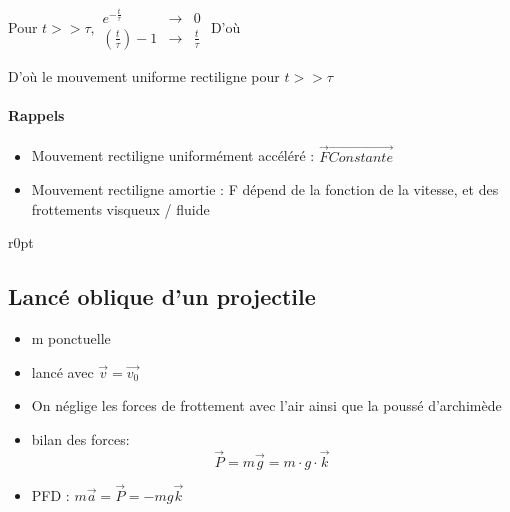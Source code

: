 Pour $t >> \tau, \begin{array}{rcl}
e^{-\frac{t}{\tau}} &\rightarrow& 0 \\
(\frac{t}{\tau})-1 &\rightarrow& \frac{t}{\tau}
\end{array}$ D'où ~\\
\begin{center}\end{center}
D'où le mouvement uniforme rectiligne pour $t >> \tau$

\paragraph{Rappels}
\begin{itemize}
\item Mouvement rectiligne uniformément accéléré : $\vec{F} \overrightarrow{Constante}$
\item Mouvement rectiligne amortie : F dépend de la fonction de la vitesse, et des frottements visqueux / fluide
\end{itemize}

\begin{wrapfigure}[10]{r}{0pt}
\end{wrapfigure}
\subsection{Lancé oblique d'un projectile}


\begin{itemize}
	\item m ponctuelle
	\item lancé avec $\vec{v} = \vec{v_0}$
	\item On néglige les forces de frottement avec l'air ainsi que la poussé d'archimède
	\item bilan des forces: \[\vec{P} = m \vec{g} = m \cdot g \cdot \vec{k}\]
	\item PFD : $m\vec{a} = \vec{P} = -mg\vec{k}$
\end{itemize}

